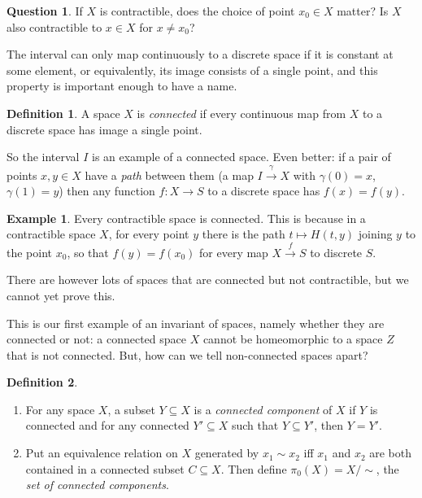 \documentclass{tufte-handout}
\newcommand{\lecturenum}[1]{\marginnote{\color{red}Lecture #1}}
\theoremstyle{definition}
\newtheorem{definition}{Definition}
\newtheorem{example}{Example}
\newtheorem{q}{Question}
\begin{document}
\begin{q}
If $X$ is contractible, does the choice of point $x_0\in X$ matter? Is $X$ also contractible
to $x\in X$ for $x\neq x_0$?
\end{q}

The interval can only map continuously to a discrete space if it is constant at some 
element, or equivalently, its image consists of a single point, and this property is 
important enough to have a name.

\begin{definition}\label{def:connected}
A space $X$ is \emph{connected} if every continuous map from $X$ to a discrete space has image a single point.
\end{definition}

So the interval $I$ is an example of a connected space. Even better: if a pair of points $x,y\in X$ 
have a \emph{path} between them (a map $I\xrightarrow{\gamma} X$ with $\gamma(0) = x$, $\gamma(1)=y$)
then any function $f\colon X\to S$ to a discrete space has $f(x)=f(y)$.

\begin{example}
Every contractible space is connected. This is because in a contractible space $X$, for every point $y$ 
there is the path $t\mapsto H(t,y)$ joining $y$ to the point $x_0$, so that $f(y)=f(x_0)$ for every map 
$X\xrightarrow{f}S$ to discrete $S$.
\end{example}

There are however lots of spaces that are connected but not contractible, but we cannot 
yet prove this.



This\lecturenum{3} is our first example of an invariant of spaces,
namely whether they are connected or not: a connected space $X$ cannot be homeomorphic 
to a space $Z$ that is not connected. But, how can we tell non-connected spaces apart?

\begin{definition}
\begin{enumerate}

	\item For any space $X$, a subset $Y\subseteq X$ is a \emph{connected component} 
	of $X$ if $Y$ is connected and for any connected $Y'\subseteq X$ such that $Y\subseteq Y'$,
	then $Y= Y'$.
	
	\item Put an equivalence relation on $X$ generated
		by $x_1\sim x_2$ iff $x_1$ and $x_2$ 
		are both contained in a connected subset $C\subseteq X$. Then define 
		$\pi_0(X) = X/\sim$, the \emph{set of connected components}. 

\end{enumerate}
\end{definition}
\end{document}
